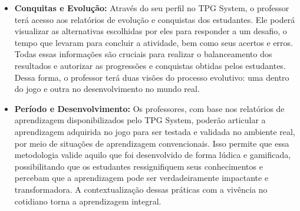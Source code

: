\begin{itemize}
\item \textbf{Conquitas e Evolução:} Através do seu perfil no TPG System, o professor terá acesso aos relatórios de evolução e conquistas dos estudantes. Ele poderá visualizar as alternativas escolhidas por eles para responder a um desafio, o tempo que levaram para concluir a atividade, bem como seus acertos e erros. Todas essas informações são cruciais para realizar o balanceamento dos resultados e autorizar as progressões e conquistas obtidas pelos estudantes. Dessa forma, o professor terá duas visões do processo evolutivo: uma dentro do jogo e outra no desenvolvimento no mundo real.
\\

\item \textbf{Período e Desenvolvimento:} Os professores, com base nos relatórios de aprendizagem disponibilizados pelo TPG System, poderão articular a aprendizagem adquirida no jogo para ser testada e validada no ambiente real, por meio de situações de aprendizagem convencionais. Isso permite que essa metodologia valide aquilo que foi desenvolvido de forma lúdica e gamificada, possibilitando que os estudantes ressignifiquem seus conhecimentos e percebam que a aprendizagem pode ser verdadeiramente impactante e transformadora. A contextualização dessas práticas com a vivência no cotidiano torna a aprendizagem integral.
\\
\end{itemize}